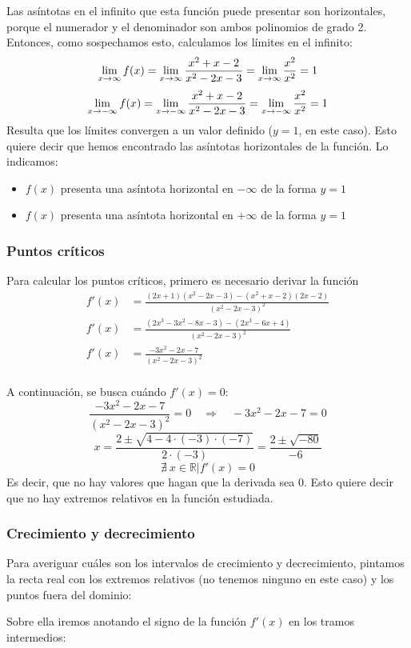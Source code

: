 \documentclass[sans]{apuntes}
\begin{document}
\begin{examplebox}
	Las asíntotas en el infinito que esta función puede presentar son horizontales, porque el numerador y el denominador son ambos polinomios de grado 2. Entonces, como sospechamos esto, calculamos los límites en el infinito:
	\[\displaystyle\lim_{x \to \infty}f(x) = \displaystyle\lim_{x \to \infty}\frac{x^{2} + x - 2}{x^{2} - 2 x - 3} = \displaystyle\lim_{x \to \infty}\frac{x^2}{x^2} = 1 \]
	\[\displaystyle\lim_{x \to -\infty}f(x) = \displaystyle\lim_{x \to -\infty}\frac{x^{2} + x - 2}{x^{2} - 2 x - 3} = \displaystyle\lim_{x \to -\infty}\frac{x^2}{x^2} = 1 \]
	Resulta que los límites convergen a un valor definido ($y = 1$, en este caso). Esto quiere decir que hemos encontrado las asíntotas horizontales de la función. Lo indicamos:
	\begin{itemize}
		\item $f(x)$ presenta una asíntota horizontal en $-\infty$ de la forma $y = 1$
		\item $f(x)$ presenta una asíntota horizontal en $+\infty$ de la forma $y = 1$
	\end{itemize}

	\subsubsection*{Puntos críticos}
	Para calcular los puntos críticos, primero es necesario derivar la función
	\begin{align*}
		f'(x) &= \frac{(2x +1)(x^2 - 2x -3) - (x^2+x -2)(2x - 2)}{(x^2 - 2x - 3)^2} \\
		f'(x) &= \frac{(2x^3 - 3x^2 - 8x - 3) - (2x^3 - 6x + 4)}{(x^2 - 2x - 3)^2} \\
		f'(x) &= \frac{- 3x^2 - 2x - 7}{(x^2 - 2x - 3)^2} \\
	\end{align*}

	A continuación, se busca cuándo $f'(x) = 0$:
	\[\frac{- 3x^2 - 2x - 7}{(x^2 - 2x - 3)^2} = 0 \quad \Longrightarrow \quad - 3x^2 - 2x - 7 = 0\]
	\[ x = \frac{2 \pm \sqrt{4 - 4\cdot(-3)\cdot(-7)}}{2\cdot(-3)} = \frac{2\pm\sqrt{-80}}{-6}\]
	\[\nexists\ x \in \mathbb{R} | f'(x) = 0\]
	Es decir, que no hay valores que hagan que la derivada sea 0. Esto quiere decir que no hay extremos relativos en la función estudiada.

	\subsubsection*{Crecimiento y decrecimiento}
	Para averiguar cuáles son los intervalos de crecimiento y decrecimiento, pintamos la recta real con los extremos relativos (no tenemos ninguno en este caso) y los puntos fuera del dominio:
	\par Sobre ella iremos anotando el signo de la función $f'(x)$ en los tramos intermedios:


\end{examplebox}
\end{document}
